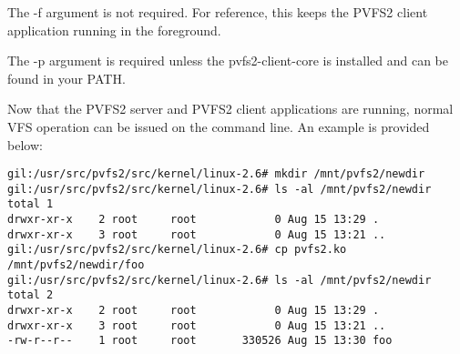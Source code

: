 \documentclass[11pt, letterpaper]{article}
\begin{document}
The -f argument is not required.  For reference, this keeps the PVFS2
client application running in the foreground.

The -p argument is required unless the pvfs2-client-core is installed
and can be found in your PATH.

Now that the PVFS2 server and PVFS2 client applications are running,
normal VFS operation can be issued on the command line.  An example is
provided below:

\begin{verbatim}
gil:/usr/src/pvfs2/src/kernel/linux-2.6# mkdir /mnt/pvfs2/newdir
gil:/usr/src/pvfs2/src/kernel/linux-2.6# ls -al /mnt/pvfs2/newdir
total 1
drwxr-xr-x    2 root     root            0 Aug 15 13:29 .
drwxr-xr-x    3 root     root            0 Aug 15 13:21 ..
gil:/usr/src/pvfs2/src/kernel/linux-2.6# cp pvfs2.ko
/mnt/pvfs2/newdir/foo
gil:/usr/src/pvfs2/src/kernel/linux-2.6# ls -al /mnt/pvfs2/newdir
total 2
drwxr-xr-x    2 root     root            0 Aug 15 13:29 .
drwxr-xr-x    3 root     root            0 Aug 15 13:21 ..
-rw-r--r--    1 root     root       330526 Aug 15 13:30 foo
\end{verbatim}
\end{document}
